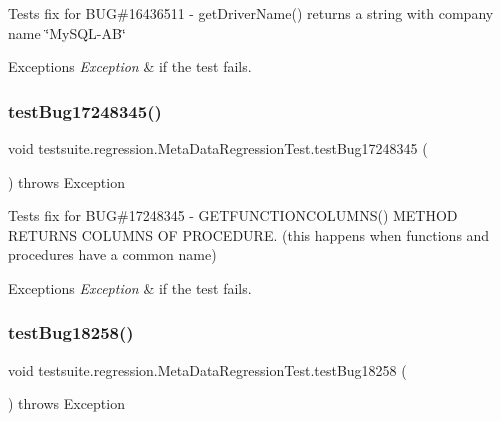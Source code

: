 Tests fix for B\+UG\#16436511 -\/ get\+Driver\+Name() returns a string with company name \char`\"{}\+My\+S\+Q\+L-\/\+A\+B\char`\"{}


\begin{DoxyExceptions}{Exceptions}
{\em Exception} & if the test fails. \\
\hline
\end{DoxyExceptions}
\mbox{\label{classtestsuite_1_1regression_1_1_meta_data_regression_test_a5eb8eb8d010b18e3193a85380d5483ba}} 
\subsubsection{\texorpdfstring{test\+Bug17248345()}{testBug17248345()}}
{\footnotesize\ttfamily void testsuite.\+regression.\+Meta\+Data\+Regression\+Test.\+test\+Bug17248345 (\begin{DoxyParamCaption}{ }\end{DoxyParamCaption}) throws Exception}

Tests fix for B\+UG\#17248345 -\/ G\+E\+T\+F\+U\+N\+C\+T\+I\+O\+N\+C\+O\+L\+U\+M\+N\+S() M\+E\+T\+H\+OD R\+E\+T\+U\+R\+NS C\+O\+L\+U\+M\+NS OF P\+R\+O\+C\+E\+D\+U\+RE. (this happens when functions and procedures have a common name)


\begin{DoxyExceptions}{Exceptions}
{\em Exception} & if the test fails. \\
\hline
\end{DoxyExceptions}
\mbox{\label{classtestsuite_1_1regression_1_1_meta_data_regression_test_af1076e63dffd2b6792697be0f509d039}} 
\subsubsection{\texorpdfstring{test\+Bug18258()}{testBug18258()}}
{\footnotesize\ttfamily void testsuite.\+regression.\+Meta\+Data\+Regression\+Test.\+test\+Bug18258 (\begin{DoxyParamCaption}{ }\end{DoxyParamCaption}) throws Exception}

